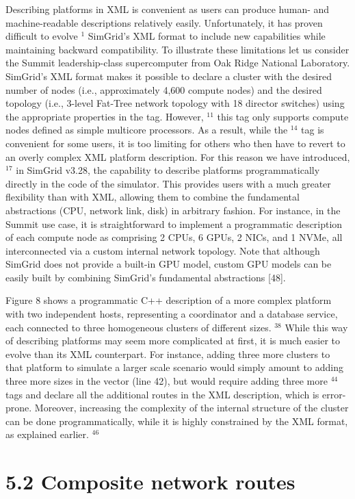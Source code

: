 \documentclass[
]{article}
\begin{document}
Describing platforms in XML is convenient as users can produce human-
and machine-readable descriptions relatively easily. Unfortunately, it
has proven difficult to evolve \(^{1}\) SimGrid's XML format to include
new capabilities while maintaining backward compatibility. To illustrate
these limitations let us consider the Summit leadership-class
supercomputer from Oak Ridge National Laboratory. SimGrid's XML format
makes it possible to declare a cluster with the desired number of nodes
(i.e., approximately 4,600 compute nodes) and the desired topology
(i.e., 3-level Fat-Tree network topology with 18 director switches)
using the appropriate properties in the tag. However, \(^{11}\) this tag
only supports compute nodes defined as simple multicore processors. As a
result, while the \(^{14}\) tag is convenient for some users, it is too
limiting for others who then have to revert to an overly complex XML
platform description. For this reason we have introduced, \(^{17}\) in
SimGrid v3.28, the capability to describe platforms programmatically
directly in the code of the simulator. This provides users with a much
greater flexibility than with XML, allowing them to combine the
fundamental abstractions (CPU, network link, disk) in arbitrary fashion.
For instance, in the Summit use case, it is straightforward to implement
a programmatic description of each compute node as comprising 2 CPUs, 6
GPUs, 2 NICs, and 1 NVMe, all interconnected via a custom internal
network topology. Note that although SimGrid does not provide a built-in
GPU model, custom GPU models can be easily built by combining SimGrid's
fundamental abstractions {[}48{]}.

Figure 8 shows a programmatic C++ description of a more complex platform
with two independent hosts, representing a coordinator and a database
service, each connected to three homogeneous clusters of different
sizes. \(^{38}\) While this way of describing platforms may seem more
complicated at first, it is much easier to evolve than its XML
counterpart. For instance, adding three more clusters to that platform
to simulate a larger scale scenario would simply amount to adding three
more sizes in the vector (line 42), but would require adding three more
\(^{44}\) tags and declare all the additional routes in the XML
description, which is error-prone. Moreover, increasing the complexity
of the internal structure of the cluster can be done programmatically,
while it is highly constrained by the XML format, as explained earlier.
\(^{46}\)

\section{5.2 Composite network routes}\label{composite-network-routes}
\end{document}
